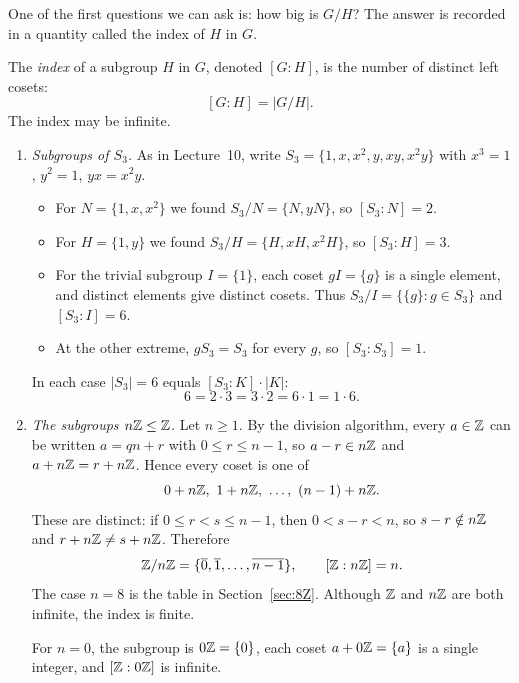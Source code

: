 \documentclass[reqno,11pt]{amsart}
\begin{document}
One of the first questions we can ask is: how big is $G/H$? The answer is recorded in a quantity called the index of $H$ in $G$.

\begin{define}[Index]
	The \emph{index} of a subgroup $H$ in $G$, denoted $[G:H]$, is the number
	of distinct left cosets:
	\[
	[G:H]=|G/H|.
	\]
	The index may be infinite.
\end{define}


\begin{example}
\leavevmode
\begin{enumerate}[label=\textbf{(\alph*)}]
  \item \emph{Subgroups of $S_3$.} As in Lecture~10, write
  $S_3=\{1,x,x^2,y,xy,x^2y\}$ with $x^3=1$, $y^2=1$, $yx=x^2y$.
  \begin{itemize}
    \item For $N=\{1,x,x^2\}$ we found $S_3/N=\{N,yN\}$, so $[S_3:N]=2$.
    \item For $H=\{1,y\}$ we found $S_3/H=\{H,xH,x^2H\}$, so
    $[S_3:H]=3$.
    \item For the trivial subgroup $I=\{1\}$, each coset $gI=\{g\}$ is a
    single element, and distinct elements give distinct cosets. Thus
    $S_3/I=\{\{g\}:g\in S_3\}$ and $[S_3:I]=6$.
    \item At the other extreme, $gS_3=S_3$ for every $g$, so
    $[S_3:S_3]=1$.
  \end{itemize}
  In each case $|S_3|=6$ equals $[S_3:K]\cdot|K|$:
  \[
    6=2\cdot3=3\cdot2=6\cdot1=1\cdot6.
  \]

  \item \emph{The subgroups $n\mathbb{Z}\leq\mathbb{Z}$.} Let $n\geq1$. By the division
  algorithm, every $a\in\mathbb{Z}$ can be written $a=qn+r$ with
  $0\leq r\leq n-1$, so $a-r\in n\mathbb{Z}$ and $a+n\mathbb{Z}=r+n\mathbb{Z}$. Hence every
  coset is one of
  \[
    0+n\Z,\ 1+n\Z,\ \ldots,\ (n-1)+n\Z.
  \]
  These are distinct: if $0\leq r<s\leq n-1$, then $0<s-r<n$, so
  $s-r\notin n\mathbb{Z}$ and $r+n\mathbb{Z}\neq s+n\mathbb{Z}$. Therefore
  \[
    \mathbb{Z}/n\mathbb{Z}=\{\overline0,\overline1,\ldots,\overline{n-1}\},
    \qquad [\mathbb{Z}:n\mathbb{Z}]=n.
  \]
  The case $n=8$ is the table in Section~\ref{sec:8Z}. Although $\mathbb{Z}$ and
  $n\mathbb{Z}$ are both infinite, the index is finite.

  For $n=0$, the subgroup is $0\mathbb{Z}=\{0\}$, each coset $a+0\mathbb{Z}=\{a\}$ is a
  single integer, and $[\mathbb{Z}:0\mathbb{Z}]$ is infinite.
\end{enumerate}
\end{example}
\end{document}
